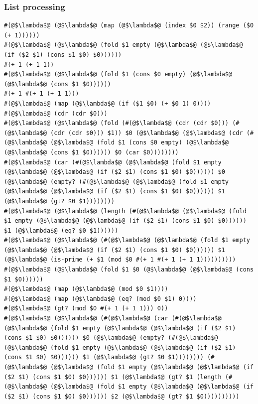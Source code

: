 \documentclass{article}
\begin{document}
\subsubsection{List processing}
\begin{lstlisting}
#(@$\lambda$@ (@$\lambda$@ (map (@$\lambda$@ (index $0 $2)) (range ($0 (+ 1))))))
#(@$\lambda$@ (@$\lambda$@ (fold $1 empty (@$\lambda$@ (@$\lambda$@ (if ($2 $1) (cons $1 $0) $0))))))
#(+ 1 (+ 1 1))
#(@$\lambda$@ (@$\lambda$@ (fold $1 (cons $0 empty) (@$\lambda$@ (@$\lambda$@ (cons $1 $0))))))
#(+ 1 #(+ 1 (+ 1 1)))
#(@$\lambda$@ (map (@$\lambda$@ (if ($1 $0) (+ $0 1) 0))))
#(@$\lambda$@ (cdr (cdr $0)))
#(@$\lambda$@ (@$\lambda$@ (fold (#(@$\lambda$@ (cdr (cdr $0))) (#(@$\lambda$@ (cdr (cdr $0))) $1)) $0 (@$\lambda$@ (@$\lambda$@ (cdr (#(@$\lambda$@ (@$\lambda$@ (fold $1 (cons $0 empty) (@$\lambda$@ (@$\lambda$@ (cons $1 $0)))))) $0 (car $0))))))))
#(@$\lambda$@ (car (#(@$\lambda$@ (@$\lambda$@ (fold $1 empty (@$\lambda$@ (@$\lambda$@ (if ($2 $1) (cons $1 $0) $0)))))) $0 (@$\lambda$@ (empty? (#(@$\lambda$@ (@$\lambda$@ (fold $1 empty (@$\lambda$@ (@$\lambda$@ (if ($2 $1) (cons $1 $0) $0)))))) $1 (@$\lambda$@ (gt? $0 $1))))))))
#(@$\lambda$@ (@$\lambda$@ (length (#(@$\lambda$@ (@$\lambda$@ (fold $1 empty (@$\lambda$@ (@$\lambda$@ (if ($2 $1) (cons $1 $0) $0)))))) $1 (@$\lambda$@ (eq? $0 $1))))))
#(@$\lambda$@ (@$\lambda$@ (#(@$\lambda$@ (@$\lambda$@ (fold $1 empty (@$\lambda$@ (@$\lambda$@ (if ($2 $1) (cons $1 $0) $0)))))) $1 (@$\lambda$@ (is-prime (+ $1 (mod $0 #(+ 1 #(+ 1 (+ 1 1))))))))))
#(@$\lambda$@ (@$\lambda$@ (fold $1 $0 (@$\lambda$@ (@$\lambda$@ (cons $1 $0))))))
#(@$\lambda$@ (map (@$\lambda$@ (mod $0 $1))))
#(@$\lambda$@ (map (@$\lambda$@ (eq? (mod $0 $1) 0))))
#(@$\lambda$@ (gt? (mod $0 #(+ 1 (+ 1 1))) 0))
#(@$\lambda$@ (@$\lambda$@ (#(@$\lambda$@ (car (#(@$\lambda$@ (@$\lambda$@ (fold $1 empty (@$\lambda$@ (@$\lambda$@ (if ($2 $1) (cons $1 $0) $0)))))) $0 (@$\lambda$@ (empty? (#(@$\lambda$@ (@$\lambda$@ (fold $1 empty (@$\lambda$@ (@$\lambda$@ (if ($2 $1) (cons $1 $0) $0)))))) $1 (@$\lambda$@ (gt? $0 $1)))))))) (#(@$\lambda$@ (@$\lambda$@ (fold $1 empty (@$\lambda$@ (@$\lambda$@ (if ($2 $1) (cons $1 $0) $0)))))) $1 (@$\lambda$@ (gt? $1 (length (#(@$\lambda$@ (@$\lambda$@ (fold $1 empty (@$\lambda$@ (@$\lambda$@ (if ($2 $1) (cons $1 $0) $0)))))) $2 (@$\lambda$@ (gt? $1 $0))))))))))
\end{lstlisting}
\end{document}

